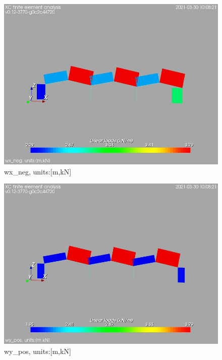 \begin{figure}
\begin{center}
\includegraphics[width=\linewidth]{calc_results/sole_zeinali/text/graphics/loads/wx_negallMemberSet}
\caption{wx_neg, units:[m,kN]}
\label{wx-neg-unitsmkn}
\end{center}
\end{figure}
\begin{figure}
\begin{center}
\includegraphics[width=\linewidth]{calc_results/sole_zeinali/text/graphics/loads/wy_posallMemberSet}
\caption{wy_pos, units:[m,kN]}
\label{wy-pos-unitsmkn}
\end{center}
\end{figure}

